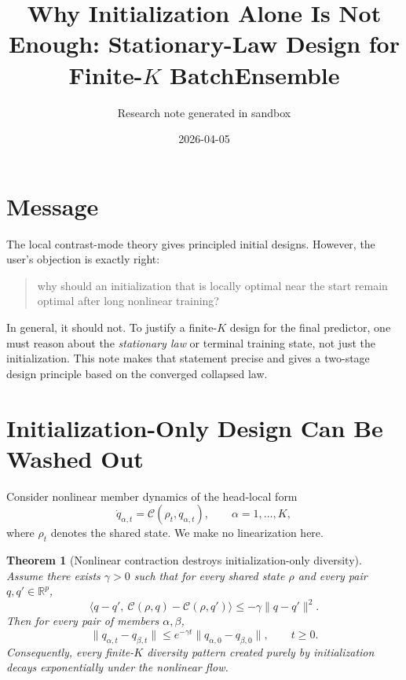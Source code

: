 \documentclass[11pt]{article}
\title{Why Initialization Alone Is Not Enough: Stationary-Law Design for Finite-\texorpdfstring{$K$}{K} BatchEnsemble}
\author{Research note generated in sandbox}
\date{2026-04-05}
\newcommand{\R}{\mathbb{R}}
\newtheorem{theorem}{Theorem}
\theoremstyle{remark}
\begin{document}
\maketitle

\section{Message}

The local contrast-mode theory gives principled initial designs. However, the user's objection is exactly right:

\begin{quote}
why should an initialization that is locally optimal near the start remain optimal after long nonlinear training?
\end{quote}

In general, it should not. To justify a finite-$K$ design for the final predictor, one must reason about the \emph{stationary law} or terminal training state, not just the initialization. This note makes that statement precise and gives a two-stage design principle based on the converged collapsed law.

\section{Initialization-Only Design Can Be Washed Out}

Consider nonlinear member dynamics of the head-local form
\begin{equation}
\dot q_{\alpha,t} = \mathcal C(\rho_t,q_{\alpha,t}),
\qquad
\alpha=1,\dots,K,
\label{eq:member-dynamics}
\end{equation}
where $\rho_t$ denotes the shared state. We make no linearization here.

\begin{theorem}[Nonlinear contraction destroys initialization-only diversity]
\label{thm:nonlinear-contraction}
Assume there exists $\gamma>0$ such that for every shared state $\rho$ and every pair $q,q'\in\R^p$,
\begin{equation}
\langle q-q',\ \mathcal C(\rho,q)-\mathcal C(\rho,q')\rangle
\le
-\gamma \|q-q'\|^2.
\label{eq:one-sided-lipschitz}
\end{equation}
Then for every pair of members $\alpha,\beta$,
\[
\|q_{\alpha,t}-q_{\beta,t}\|
\le
e^{-\gamma t}\|q_{\alpha,0}-q_{\beta,0}\|,
\qquad
t\ge 0.
\]
Consequently, every finite-$K$ diversity pattern created purely by initialization decays exponentially under the nonlinear flow.
\end{theorem}
\end{document}
